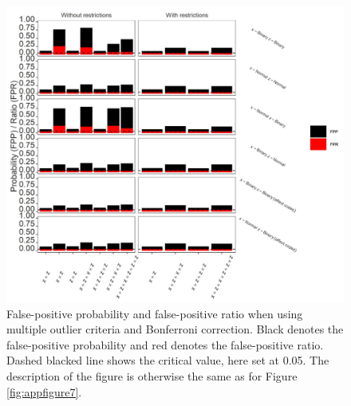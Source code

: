 \begin{figure}[ht!]
\includegraphics[width=1\textwidth]{R/Analysis/Result/Figures/Figure1BSIBon.jpeg}
\centering
\caption{False-positive probability and false-positive ratio when using multiple outlier criteria and Bonferroni correction. Black denotes the false-positive probability and red denotes the false-positive ratio. Dashed blacked line shows the critical value, here set at 0.05. The description of the figure is otherwise the same as for Figure \ref{fig:appfigure7}.
}
\label{fig:appfigure10}
\end{figure}


